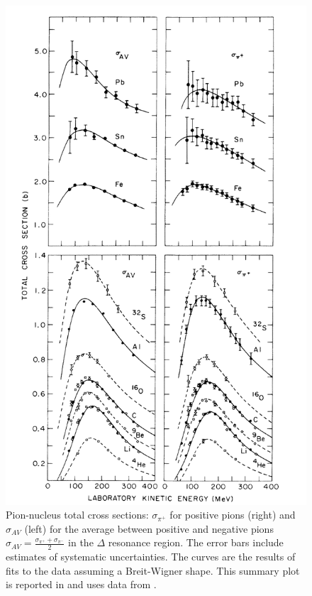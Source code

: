 \begin{figure}[hbpt]
\centering
\includegraphics[scale=0.9]{Chapter-1/Images/PionsOnNuclei.png}
\caption{Pion-nucleus total cross sections:  $\sigma_{\pi^+}$ for positive pions (right) and $\sigma_{AV}$ (left) for the average between positive and negative pions $\sigma_{AV} = \frac{\sigma_{\pi^+} + \sigma_{\pi^-}}{2}$  in  the $\Delta$ resonance region.  The error bars include estimates of systematic uncertainties. The curves are the results of fits to the data assuming a Breit-Wigner shape. This summary plot  is reported in \cite{PhysRevC.14.635} and uses data from \cite{Clough1974, Wilkin:1973xd}.
}
\label{fig:pi1}
\end{figure}

